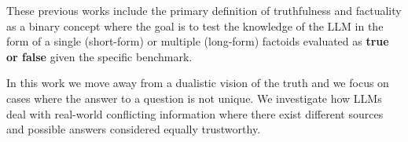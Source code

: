 These previous works include the primary definition of truthfulness and factuality as a binary concept where the goal is to test the knowledge of the LLM in the form of a single (short-form) or multiple (long-form) factoids evaluated as \textbf{true or false} given the specific benchmark. 

In this work we move away from a dualistic vision of the truth and we focus on cases where the answer to a question is not unique. We investigate how LLMs deal with real-world conflicting information where there exist different sources and possible answers considered equally trustworthy. 









